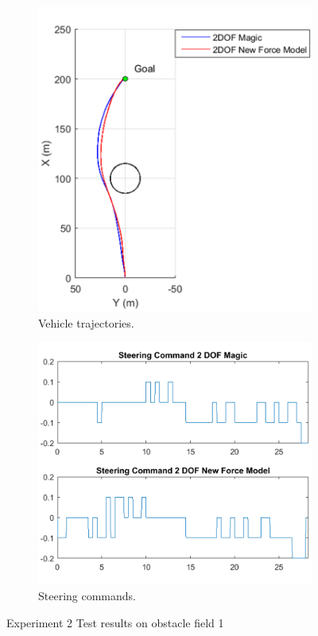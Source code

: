 \documentclass[12pt,onecolumn]{report}
\begin{document}
\begin{figure}
	\centering
	\begin{subfigure}[b]{0.49\columnwidth}
		\centering
		\includegraphics[height=\columnwidth]{Figs/Field1MagicvBekkerTrajectories_cropped.png}
		\caption{{\small Vehicle trajectories.}}   
		\label{fig:ObstacleField1TrajectoriesExp2}
	\end{subfigure}
	\hfill
	\begin{subfigure}[b]{0.49\columnwidth}
		\centering
		\includegraphics[width=\columnwidth]{Figs/Field1MagicvBekkerSteeringCommands_cropped.png}
		\caption{\small Steering commands.}   
		\label{fig:SteeringCommandsField1Exp2}
	\end{subfigure}
	\caption{\small Experiment 2 Test results on obstacle field 1}
	\label{fig:Obst1TestDataExp2}
\end{figure}
\end{document}
